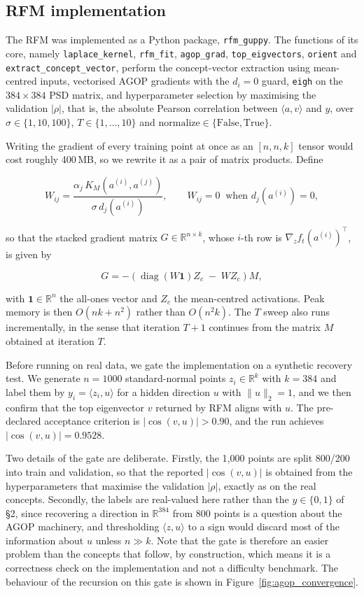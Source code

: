 \subsection{RFM implementation}

The RFM was implemented as a Python package, \verb|rfm_guppy|. The functions of its core,
namely \verb|laplace_kernel|, \verb|rfm_fit|, \verb|agop_grad|, \verb|top_eigvectors|,
\verb|orient| and \verb|extract_concept_vector|, perform the concept-vector extraction
using mean-centred inputs, vectorised AGOP gradients with the $d_i = 0$ guard, \verb|eigh|
on the $384 \times 384$ PSD matrix, and hyperparameter selection by maximising the
validation $|\rho|$, that is, the absolute Pearson correlation between
$\langle a, v \rangle$ and $y$, over $\sigma \in \{1, 10, 100\}$, $T \in \{1, \dots, 10\}$
and $\mathrm{normalize} \in \{\mathrm{False}, \mathrm{True}\}$.

Writing the gradient of every training point at once as an $[n, n, k]$ tensor would cost
roughly 400\,MB, so we rewrite it as a pair of matrix products. Define

\[
  W_{ij} = \frac{\alpha_j \, K_M\!\left(a^{(i)}, a^{(j)}\right)}
                {\sigma \, d_j\!\left(a^{(i)}\right)},
  \qquad
  W_{ij} = 0 \ \text{ when } d_j\!\left(a^{(i)}\right) = 0,
\]

so that the stacked gradient matrix $G \in \mathbb{R}^{n \times k}$, whose $i$-th row is
$\nabla_z f_t(a^{(i)})^{\top}$, is given by

\[
  G = -\left(\operatorname{diag}\!\left(W \mathbf{1}\right) Z_c \;-\; W Z_c\right) M ,
\]

with $\mathbf{1} \in \mathbb{R}^{n}$ the all-ones vector and $Z_c$ the mean-centred
activations. Peak memory is then $O(nk + n^2)$ rather than $O(n^2 k)$. The $T$ sweep also
runs incrementally, in the sense that iteration $T+1$ continues from the matrix $M$
obtained at iteration $T$.

Before running on real data, we gate the implementation on a synthetic recovery test. We
generate $n = 1000$ standard-normal points $z_i \in \mathbb{R}^{k}$ with $k = 384$ and
label them by $y_i = \langle z_i, u \rangle$ for a hidden direction $u$ with
$\|u\|_2 = 1$, and we then confirm that the top eigenvector $v$ returned by RFM aligns
with $u$. The pre-declared acceptance criterion is $|\cos(v, u)| > 0.90$, and the run
achieves $|\cos(v, u)| = 0.9528$.

Two details of the gate are deliberate. Firstly, the 1{,}000 points are split 800/200 into
train and validation, so that the reported $|\cos(v,u)|$ is obtained from the
hyperparameters that maximise the validation $|\rho|$, exactly as on the real concepts.
Secondly, the labels are real-valued here rather than the $y \in \{0,1\}$ of §2, since
recovering a direction in $\mathbb{R}^{384}$ from 800 points is a question about the AGOP
machinery, and thresholding $\langle z, u \rangle$ to a sign would discard most of the
information about $u$ unless $n \gg k$. Note that the gate is therefore an easier problem
than the concepts that follow, by construction, which means it is a correctness check on
the implementation and not a difficulty benchmark. The behaviour of the recursion on this
gate is shown in Figure~\ref{fig:agop_convergence}.

